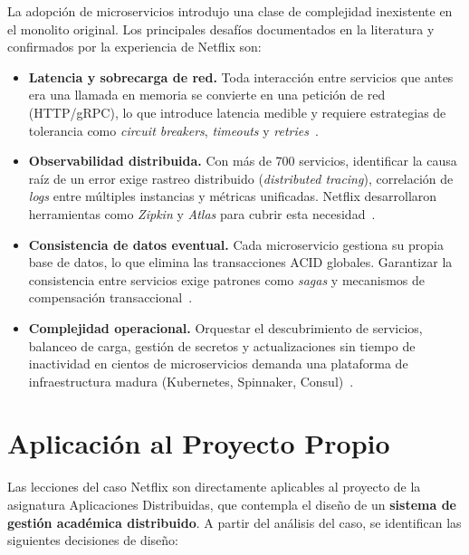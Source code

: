 \documentclass[11pt,a4paper]{article}
\begin{document}
La adopci\'on de microservicios introdujo una clase de complejidad inexistente en el monolito
original. Los principales desaf\'ios documentados en la literatura y confirmados por la
experiencia de Netflix son:

\begin{itemize}[leftmargin=*, itemsep=3pt]

  \item \textbf{Latencia y sobrecarga de red.} Toda interacci\'on entre servicios que
  antes era una llamada en memoria se convierte en una petici\'on de red (HTTP/gRPC), lo
  que introduce latencia medible y requiere estrategias de tolerancia como
  \textit{circuit breakers}, \textit{timeouts} y \textit{retries}~\cite{dragoni2017}.

  \item \textbf{Observabilidad distribuida.} Con m\'as de 700 servicios, identificar la
  causa ra\'iz de un error exige rastreo distribuido (\textit{distributed tracing}),
  correlaci\'on de \textit{logs} entre m\'ultiples instancias y m\'etricas unificadas.
  Netflix desarrollaron herramientas como \textit{Zipkin} y \textit{Atlas} para cubrir
  esta necesidad~\cite{balalaie2016}.

  \item \textbf{Consistencia de datos eventual.} Cada microservicio gestiona su propia
  base de datos, lo que elimina las transacciones ACID globales. Garantizar la
  consistencia entre servicios exige patrones como \textit{sagas} y mecanismos de
  compensaci\'on transaccional~\cite{blinowski2022}.

  \item \textbf{Complejidad operacional.} Orquestar el descubrimiento de servicios,
  balanceo de carga, gesti\'on de secretos y actualizaciones sin tiempo de inactividad
  en cientos de microservicios demanda una plataforma de infraestructura madura
  (Kubernetes, Spinnaker, Consul)~\cite{miguel2022}.

\end{itemize}

\section{Aplicaci\'on al Proyecto Propio}

Las lecciones del caso Netflix son directamente aplicables al proyecto de la asignatura
Aplicaciones Distribuidas, que contempla el dise\~no de un \textbf{sistema de gesti\'on
acad\'emica distribuido}. A partir del an\'alisis del caso, se identifican las siguientes
decisiones de dise\~no:
\end{document}
